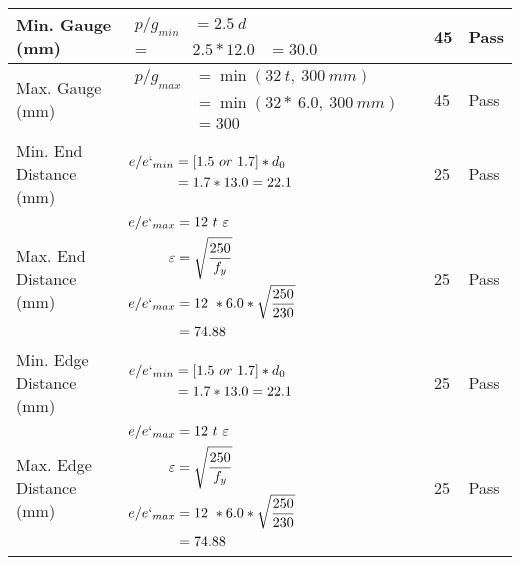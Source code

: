 \documentclass{article}%
\begin{document}
\begin{longtable}{|p{4cm}|p{6cm}|p{5.5cm}|p{1.5cm}|}
\hline%
Min. Gauge (mm)&$\begin{aligned}p/g_{min}&= 2.5 ~ d&\\ =&2.5*12.0&=30.0\end{aligned}$&45&Pass\\%
\hline%
Max. Gauge (mm)&$\begin{aligned}p/g_{max} &=\min(32~t,~300~mm)&\\ &=\min(32 *~6.0,~ 300 ~mm)\\&=300\end{aligned}$&45&Pass\\%
\hline%
Min. End Distance (mm)&$\begin{aligned}e/e`_{min} &=[1.5~or~ 1.7] * d_0\\ &=1.7*13.0=22.1 \end{aligned}$&25&Pass\\%
\hline%
Max. End Distance (mm)&$\begin{aligned}e/e`_{max} &= 12~ t~ \varepsilon&\\ \varepsilon &= \sqrt{\frac{250}{f_y}}\\ e/e`_{max}&=12 ~*6.0*\sqrt{\frac{250}{230}}\\ &=74.88\\ \end{aligned}$&25&Pass\\%
\hline%
Min. Edge Distance (mm)&$\begin{aligned}e/e`_{min} &=[1.5~or~ 1.7] * d_0\\ &=1.7*13.0=22.1 \end{aligned}$&25&Pass\\%
\hline%
Max. Edge Distance (mm)&$\begin{aligned}e/e`_{max} &= 12~ t~ \varepsilon&\\ \varepsilon &= \sqrt{\frac{250}{f_y}}\\ e/e`_{max}&=12 ~*6.0*\sqrt{\frac{250}{230}}\\ &=74.88\\ \end{aligned}$&25&Pass\\%
\hline%
\end{longtable}

%
\end{document}
